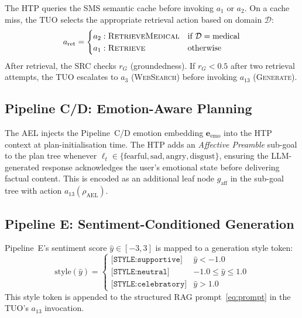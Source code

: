 \documentclass[10pt,conference]{IEEEtran}
\theoremstyle{ieeethm}
\theoremstyle{ieeedef}
\theoremstyle{ieeeremark}
\begin{document}
The HTP queries the SMS semantic cache before invoking $a_1$ or $a_2$. On a cache miss, the TUO selects the appropriate retrieval action based on domain $\mathcal{D}$:
\begin{equation}
a_\text{ret} = \begin{cases}
a_2: \textsc{RetrieveMedical} & \text{if } \mathcal{D} = \text{medical} \\
a_1: \textsc{Retrieve}        & \text{otherwise}
\end{cases}
\label{eq:retrieval_routing}
\end{equation}
After retrieval, the SRC checks $r_G$ (groundedness). If $r_G < 0.5$ after two retrieval attempts, the TUO escalates to $a_3$ (\textsc{WebSearch}) before invoking $a_{13}$ (\textsc{Generate}).

\subsection{Pipeline C/D: Emotion-Aware Planning}

The AEL injects the Pipeline~C/D emotion embedding $\mathbf{e}_\text{emo}$ into the HTP context at plan-initialisation time. The HTP adds an \emph{Affective Preamble} sub-goal to the plan tree whenever $\ell_t \in \{\text{fearful}, \text{sad}, \text{angry}, \text{disgust}\}$, ensuring the LLM-generated response acknowledges the user's emotional state before delivering factual content. This is encoded as an additional leaf node $g_\text{aff}$ in the sub-goal tree with action $a_{13}(\rho_\text{AEL})$.

\subsection{Pipeline E: Sentiment-Conditioned Generation}

Pipeline~E's sentiment score $\hat{y} \in [-3, 3]$ is mapped to a generation style token:
\begin{equation}
\text{style}(\hat{y}) = \begin{cases}
\texttt{[STYLE:supportive]} & \hat{y} < -1.0 \\
\texttt{[STYLE:neutral]}    & -1.0 \leq \hat{y} \leq 1.0 \\
\texttt{[STYLE:celebratory]}& \hat{y} > 1.0
\end{cases}
\label{eq:style_token}
\end{equation}
This style token is appended to the structured RAG prompt~\eqref{eq:prompt} in the TUO's $a_{13}$ invocation.
\end{document}
